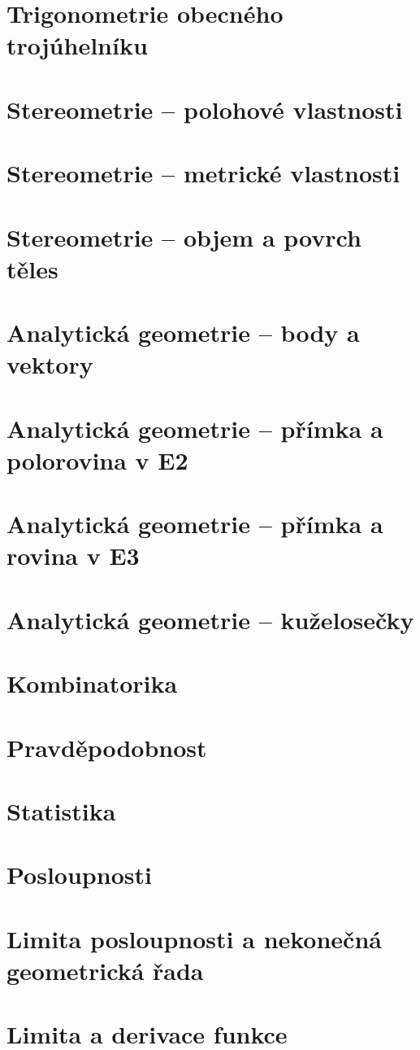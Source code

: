 \documentclass[12pt, a4paper]{article}
\begin{document}
\section{Trigonometrie obecného trojúhelníku}
\section{Stereometrie – polohové vlastnosti}
\section{Stereometrie – metrické vlastnosti}
\section{Stereometrie – objem a povrch těles}
\section{Analytická geometrie – body a vektory}
\section{Analytická geometrie – přímka a polorovina v E2}
\section{Analytická geometrie – přímka a rovina v E3}
\section{Analytická geometrie – kuželosečky}
\section{Kombinatorika}
\section{Pravděpodobnost}
\section{Statistika}
\section{Posloupnosti}
\section{Limita posloupnosti a nekonečná geometrická řada}
\section{Limita a derivace funkce}
\end{document}
